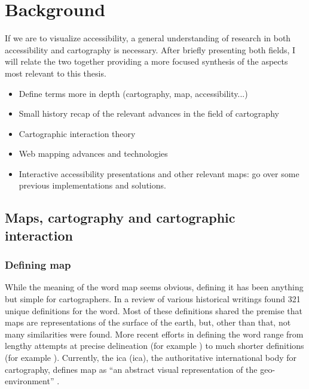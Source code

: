 \section{Background}

If we are to visualize accessibility,
a general understanding of research in both accessibility and cartography is necessary.
After briefly presenting both fields,
I will relate the two together
providing a more focused synthesis of the aspects most relevant to this thesis.

\begin{itemize}
	\item Define terms more in depth (cartography, map, accessibility...)
	\item Small history recap of the relevant advances in the field of cartography
	\item Cartographic interaction theory
	\item Web mapping advances and technologies
	\item Interactive accessibility presentations and other relevant maps: go over some previous implementations and solutions.
\end{itemize}

\subsection{Maps, cartography and cartographic interaction}

\subsubsection{Defining map}
While the meaning of the word map seems obvious,
defining it has been anything but simple for cartographers.
In a review of various historical writings \textcite{and1996}
found 321 unique definitions for the word.
Most of these definitions shared the premise that
maps are representations of the surface of the earth,
but, other than that, not many similarities were found.
More recent efforts in defining the word range
from lengthy attempts at precise delineation
(for example \textcite{ica2003})
to much shorter definitions (for example \textcite{kra2017}).
Currently, the \acrlong{ica} (\acrshort{ica}),
the authoritative international body for cartography,
defines map as \enquote{an abstract visual representation of the geo-environment}
\parencite{ica2019}.

